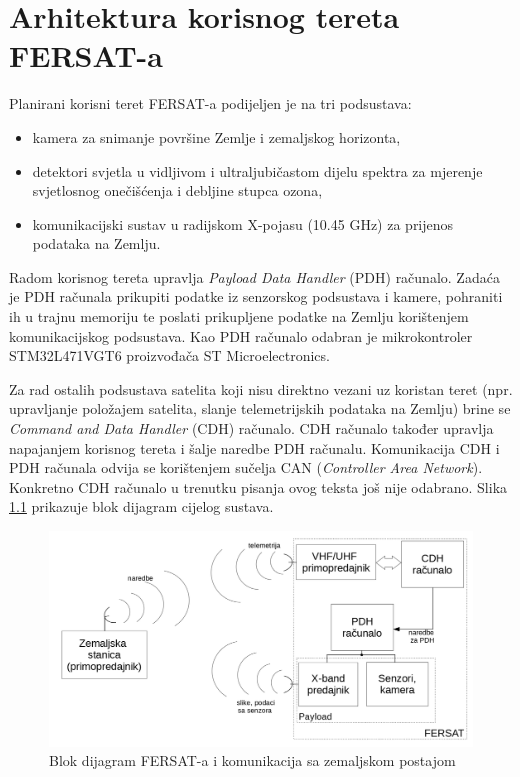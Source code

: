 \chapter{Arhitektura korisnog tereta FERSAT-a}

Planirani korisni teret  FERSAT-a podijeljen je na tri podsustava:

\begin{itemize}
    \item kamera za snimanje površine Zemlje i zemaljskog horizonta,
    \item detektori svjetla u vidljivom i ultraljubičastom dijelu spektra za mjerenje svjetlosnog onečišćenja i debljine stupca ozona,
    \item komunikacijski sustav u radijskom X-pojasu (10.45 GHz) za prijenos podataka na Zemlju.
\end{itemize}

Radom korisnog tereta upravlja \textit{Payload Data Handler} (PDH) računalo. Zadaća je PDH računala prikupiti podatke iz senzorskog podsustava i kamere, pohraniti ih u trajnu memoriju  te poslati prikupljene podatke na Zemlju korištenjem komunikacijskog podsustava. Kao PDH računalo odabran je mikrokontroler STM32L471VGT6 proizvođača ST Microelectronics.

Za rad ostalih podsustava satelita koji nisu direktno vezani uz koristan teret (npr. upravljanje položajem satelita, slanje telemetrijskih podataka na Zemlju) brine se \textit{Command and Data Handler} (CDH) računalo. CDH računalo također upravlja napajanjem korisnog tereta i šalje naredbe PDH računalu. Komunikacija CDH i PDH računala odvija se korištenjem sučelja CAN (\textit{Controller Area Network}). Konkretno CDH računalo u trenutku pisanja ovog teksta još nije odabrano. Slika \ref{fig:fersat_blok} prikazuje blok dijagram cijelog sustava.

\begin{figure}[htb]
    \centering
    \includegraphics[width=\textwidth]{slike/fersat_blok_dijagram.png}
    \caption{Blok dijagram FERSAT-a i komunikacija sa zemaljskom postajom \cite{diplomski_goran_petrak}}
    \label{fig:fersat_blok}
\end{figure}

